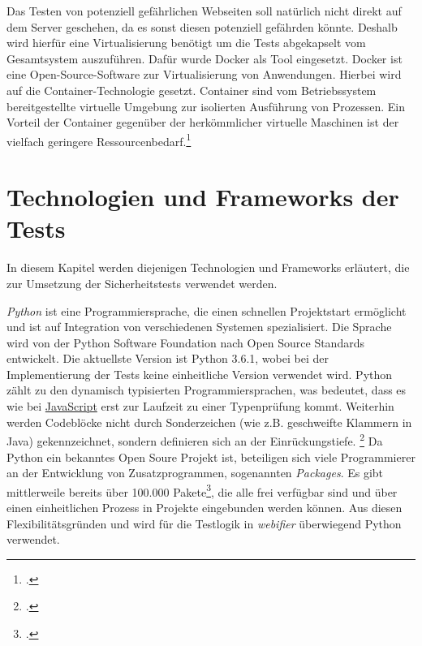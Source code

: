 Das Testen von potenziell gefährlichen Webseiten soll natürlich nicht direkt auf dem Server geschehen, da es sonst diesen potenziell gefährden könnte. Deshalb wird hierfür eine Virtualisierung benötigt um die Tests abgekapselt vom Gesamtsystem auszuführen. Dafür wurde Docker als Tool eingesetzt. Docker ist eine Open-Source-Software zur Virtualisierung von Anwendungen. Hierbei wird auf die Container-Technologie gesetzt. Container sind vom Betriebssystem bereitgestellte virtuelle Umgebung zur isolierten Ausführung von Prozessen. Ein Vorteil der Container gegenüber der herkömmlicher virtuelle Maschinen ist der vielfach geringere Ressourcenbedarf.\footcite[Vgl.][]{docker}

\section{Technologien und Frameworks der Tests}

In diesem Kapitel werden diejenigen Technologien und Frameworks erläutert, die zur Umsetzung der Sicherheitstests verwendet werden.

\textit{Python} ist eine Programmiersprache, die einen schnellen Projektstart ermöglicht und ist auf Integration von verschiedenen Systemen spezialisiert.
Die Sprache wird von der Python Software Foundation nach Open Source Standards entwickelt.
Die aktuellste Version ist Python 3.6.1, wobei bei der Implementierung der Tests keine einheitliche Version verwendet wird.
Python zählt zu den dynamisch typisierten Programmiersprachen, was bedeutet, dass es wie bei \hyperref[par:javascript]{JavaScript} erst zur Laufzeit zu einer Typenprüfung kommt.
Weiterhin werden Codeblöcke nicht durch Sonderzeichen (wie z.B. geschweifte Klammern in Java) gekennzeichnet, sondern definieren sich an der Einrückungstiefe.
\footcite[Vgl.][]{pythonHomepage}
Da Python ein bekanntes Open Soure Projekt ist, beteiligen sich viele Programmierer an der Entwicklung von Zusatzprogrammen, sogenannten \textit{Packages}.
Es gibt mittlerweile bereits über 100.000 Pakete\footcite[Vgl.][]{pypi}, die alle frei verfügbar sind und über einen einheitlichen Prozess in Projekte eingebunden werden können.
Aus diesen Flexibilitätsgründen und wird für die Testlogik in \textit{webifier} überwiegend Python verwendet.

